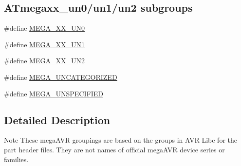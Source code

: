 \subsection*{A\-Tmegaxx\-\_\-un0/un1/un2 subgroups}
\begin{DoxyCompactItemize}
\item 
\#define \hyperlink{group__mega__part__macros__group_gae1703e1537f2cbb10b4a8992c8b7b70b}{M\-E\-G\-A\-\_\-\-X\-X\-\_\-\-U\-N0}
\item 
\#define \hyperlink{group__mega__part__macros__group_gaad35e34280ef078dec0cc18c3ea6d3f6}{M\-E\-G\-A\-\_\-\-X\-X\-\_\-\-U\-N1}
\item 
\#define \hyperlink{group__mega__part__macros__group_ga5f4566d4ddaa3cee92d4c78162594f2d}{M\-E\-G\-A\-\_\-\-X\-X\-\_\-\-U\-N2}
\item 
\#define \hyperlink{group__mega__part__macros__group_ga9252d02a9216d5e9bf94000667ad6cb1}{M\-E\-G\-A\-\_\-\-U\-N\-C\-A\-T\-E\-G\-O\-R\-I\-Z\-E\-D}
\item 
\#define \hyperlink{group__mega__part__macros__group_gaabb3078f36ad4d875915bd54fa46f337}{M\-E\-G\-A\-\_\-\-U\-N\-S\-P\-E\-C\-I\-F\-I\-E\-D}
\end{DoxyCompactItemize}


\subsection{Detailed Description}
\begin{DoxyNote}{Note}
These mega\-A\-V\-R groupings are based on the groups in A\-V\-R Libc for the part header files. They are not names of official mega\-A\-V\-R device series or families. 
\end{DoxyNote}


